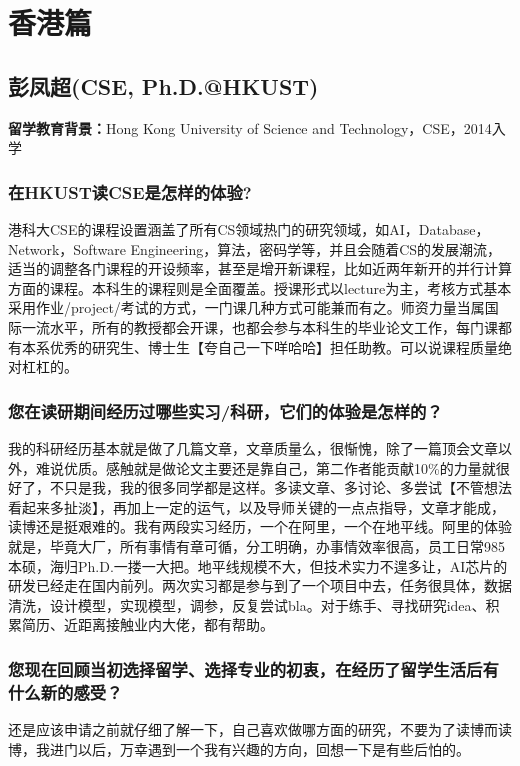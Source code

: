 \documentclass[a4paper,UTF8]{book}
\begin{document}
\clearpage
\section{香港篇}

\clearpage
\subsection{彭凤超(CSE, Ph.D.@HKUST)}
    \textbf{留学教育背景：}Hong Kong University of Science and Technology，CSE，2014入学

    \subsubsection*{在HKUST读CSE是怎样的体验?}
    港科大CSE的课程设置涵盖了所有CS领域热门的研究领域，如AI，Database，Network，Software Engineering，算法，密码学等，并且会随着CS的发展潮流，适当的调整各门课程的开设频率，甚至是增开新课程，比如近两年新开的并行计算方面的课程。本科生的课程则是全面覆盖。授课形式以lecture为主，考核方式基本采用作业/project/考试的方式，一门课几种方式可能兼而有之。师资力量当属国际一流水平，所有的教授都会开课，也都会参与本科生的毕业论文工作，每门课都有本系优秀的研究生、博士生【夸自己一下咩哈哈】担任助教。可以说课程质量绝对杠杠的。
    \subsubsection*{您在读研期间经历过哪些实习/科研，它们的体验是怎样的？}
    我的科研经历基本就是做了几篇文章，文章质量么，很惭愧，除了一篇顶会文章以外，难说优质。感触就是做论文主要还是靠自己，第二作者能贡献10\%的力量就很好了，不只是我，我的很多同学都是这样。多读文章、多讨论、多尝试【不管想法看起来多扯淡】，再加上一定的运气，以及导师关键的一点点指导，文章才能成，读博还是挺艰难的。我有两段实习经历，一个在阿里，一个在地平线。阿里的体验就是，毕竟大厂，所有事情有章可循，分工明确，办事情效率很高，员工日常985本硕，海归Ph.D.一搂一大把。地平线规模不大，但技术实力不遑多让，AI芯片的研发已经走在国内前列。两次实习都是参与到了一个项目中去，任务很具体，数据清洗，设计模型，实现模型，调参，反复尝试bla。对于练手、寻找研究idea、积累简历、近距离接触业内大佬，都有帮助。
    \subsubsection*{您现在回顾当初选择留学、选择专业的初衷，在经历了留学生活后有什么新的感受？}
    还是应该申请之前就仔细了解一下，自己喜欢做哪方面的研究，不要为了读博而读博，我进门以后，万幸遇到一个我有兴趣的方向，回想一下是有些后怕的。
\end{document}
